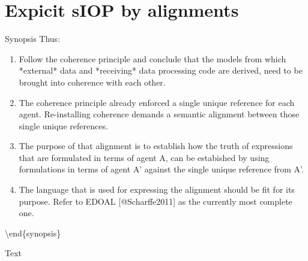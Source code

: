 \documentclass[a4paper,11pt,oneside,oldfontcommands]{memoir}
\theoremstyle{definition}
\theoremstyle{break}		%
\numberwithin{equation}{chapter}
\numberwithin{figure}{chapter}
\begin{document}
\hypertarget{expicit-siop-by-alignments}{%
\section{Expicit sIOP by alignments}\label{expicit-siop-by-alignments}}

Synopsis Thus:

\begin{enumerate}
\item Follow the coherence principle and conclude that the models from which *external* data and *receiving* data processing code are derived, need to be brought into coherence with each other.
\item The coherence principle already enforced a single unique reference for each agent. Re-installing coherence demands a semantic alignment between those single unique references. 
\item The purpose of that alignment is to establish how the truth of expressions that are formulated in terms of agent A, can be estabished by using formulations in terms of agent A' against the single unique reference from A'. 
\item The language that is used for expressing the alignment should be fit for its purpose. Refer to EDOAL [@Scharffe2011] as the currently most complete one.
\end{enumerate}

\textbackslash{}end\{synopsis\}

Text
\end{document}
